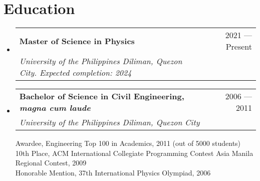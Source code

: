 \documentclass[letterpaper,11pt]{article}
\makeatletter
\newcommand{\resumeSubheading}[4]{
  \vspace{-1pt}\item
    \begin{tabular*}{0.97\textwidth}[t]{l@{\extracolsep{\fill}}r}
      \textbf{#1} & #2 \\
      \textit{\small #3} & \textit{\small #4} \\
    \end{tabular*}\vspace{-5pt}
}
\newcommand{\resumeSubheadingSubYear}[2]{
  \vspace{-1pt}\item
    \begin{tabular*}{0.97\textwidth}[t]{l@{\extracolsep{\fill}}r}
      \textbf{#1} & #2
    \end{tabular*}\vspace{1pt}
}
\newcommand{\resumeSubSubHeading}[2]{
  \begin{tabular*}{0.97\textwidth}[t]{l@{\extracolsep{\fill}}r}
    \textit{\small{#1}} & \small{#2}
  \end{tabular*}\vspace{-8pt}
}
\newcommand{\resumeSubHeadingListStart}{\begin{itemize}[leftmargin=*, label={}]}
\newcommand{\resumeSubHeadingListEnd}{\end{itemize}\vspace{-5pt}}
\newcommand{\resumeItemListStart}{\begin{itemize}}
\newcommand{\resumeItemListEnd}{\end{itemize}\vspace{-5pt}}
\makeatother
\begin{document}
\section{Education}
  \resumeSubHeadingListStart
    \resumeSubheading
      {Master of Science in Physics}{2021 --- Present}
      {\vspace{5pt}University of the Philippines Diliman, Quezon City. Expected completion: 2024}{}

    \resumeSubheading
      {Bachelor of Science in Civil Engineering, \textit{magna cum laude}}{2006 --- 2011}
      {\vspace{5pt}University of the Philippines Diliman, Quezon City}{}
      \small Awardee, Engineering Top 100 in Academics, 2011 (out of 5000 students) \\
      \small 10th Place, ACM International Collegiate Programming Contest Asia Manila Regional Contest, 2009 \\
      \small Honorable Mention, 37th International Physics Olympiad, 2006
  \resumeSubHeadingListEnd





\end{document}
